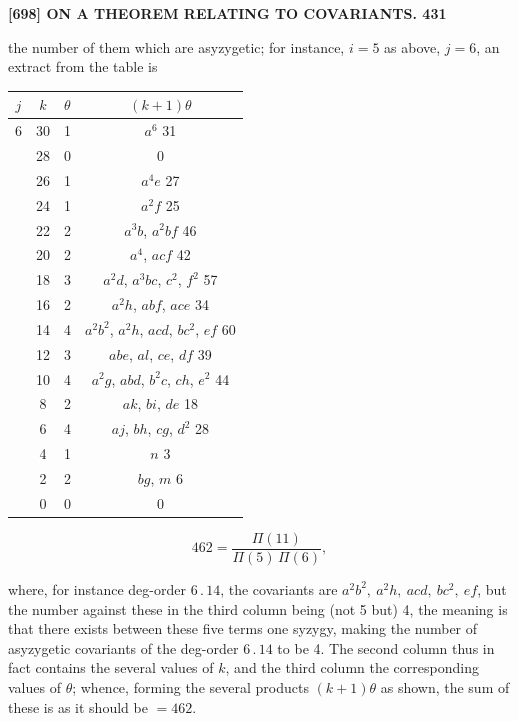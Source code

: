 \documentclass[11pt]{article}
\begin{document}
\noindent\textbf{[698] \quad ON A THEOREM RELATING TO COVARIANTS. \hfill 431}

\medskip

the number of them which are asyzygetic; for instance, $i=5$ as above, $j=6$, an extract from the table is

\medskip

\begin{center}
\begin{tabular}{c|c|l|c}
$j$ & $k$ & $\theta$ & $(k+1)\theta$ \\
\hline
$6$ & 30 & 1 & $a^6$ \hfill 31 \\
    & 28 & 0 &      \hfill 0 \\
    & 26 & 1 & $a^4 e$ \hfill 27 \\
    & 24 & 1 & $a^2 f$ \hfill 25 \\
    & 22 & 2 & $a^3 b$, $a^2 bf$ \hfill 46 \\
    & 20 & 2 & $a^4$, $acf$ \hfill 42 \\
    & 18 & 3 & $a^2 d$, $a^3 bc$, $c^2$, $f^2$ \hfill 57 \\
    & 16 & 2 & $a^2 h$, $abf$, $ace$ \hfill 34 \\
    & 14 & 4 & $a^2 b^2$, $a^2 h$, $acd$, $bc^2$, $ef$ \hfill 60 \\
    & 12 & 3 & $abe$, $a l$, $ce$, $df$ \hfill 39 \\
    & 10 & 4 & $a^2 g$, $abd$, $b^2 c$, $ch$, $e^2$ \hfill 44 \\
    & 8  & 2 & $ak$, $bi$, $de$ \hfill 18 \\
    & 6  & 4 & $aj$, $bh$, $cg$, $d^2$ \hfill 28 \\
    & 4  & 1 & $n$ \hfill 3 \\
    & 2  & 2 & $bg$, $m$ \hfill 6 \\
    & 0  & 0 &  \hfill 0 \\
\end{tabular}
\end{center}

\medskip

\[
   462 = \frac{\Pi(11)}{\Pi(5)\,\Pi(6)},
\]

\noindent
where, for instance deg-order $6\,.\,14$, the covariants are $a^2 b^2,\ a^2 h,\ acd,\ bc^2,\ ef$, but the number against these in the third column being (not 5 but) 4, the meaning is that there exists between these five terms one syzygy, making the number of asyzygetic covariants of the deg-order $6\,.\,14$ to be 4. The second column thus in fact contains the several values of $k$, and the third column the corresponding values of $\theta$; whence, forming the several products $(k+1)\theta$ as shown, the sum of these is as it should be $=462$.
\end{document}
